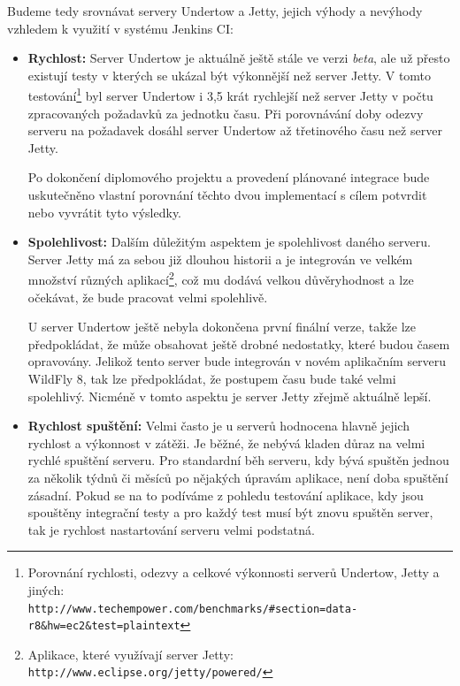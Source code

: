             \medskip
            Budeme tedy srovnávat servery Undertow a Jetty, jejich výhody a nevýhody
            vzhledem k využití v systému Jenkins CI:
            \begin{itemize}
                \item {\textbf{Rychlost:} Server Undertow je aktuálně ještě stále ve verzi \emph{beta}, ale už přesto existují
                    testy v kterých se ukázal být výkonnější než server Jetty. V tomto           
                    testování\footnote{Porovnání rychlosti, odezvy a celkové výkonnosti serverů Undertow, Jetty a jiných: 
                    \\\texttt{http://www.techempower.com/benchmarks/\#section=data-r8\&hw=ec2\&test=plaintext}}
                    byl server Undertow i 3,5 krát rychlejší než server Jetty v počtu zpracovaných
                    požadavků za jednotku času. Při porovnávání doby odezvy serveru na požadavek
                    dosáhl server Undertow až třetinového času než server Jetty.
        
                    Po dokončení diplomového projektu a provedení plánované
                    integrace bude uskutečněno vlastní porovnání těchto dvou implementací s cílem potvrdit
                    nebo vyvrátit tyto výsledky.}

                \item{\textbf{Spolehlivost:} Dalším důležitým aspektem je spolehlivost daného serveru. 
                        Server Jetty má za sebou již dlouhou historii a je integrován ve velkém množství
                        různých aplikací\footnote{Aplikace, které využívají server Jetty: \texttt{http://www.eclipse.org/jetty/powered/}},
                        což mu dodává velkou důvěryhodnost a lze očekávat, že bude pracovat velmi 
                        spolehlivě. 
                        
                        U server Undertow ještě nebyla dokončena první finální verze,
                        takže lze předpokládat, že může obsahovat ještě drobné nedostatky,
                        které budou časem opravovány. Jelikož tento server bude integrován
                        v novém aplikačním serveru WildFly 8, tak lze předpokládat,
                        že postupem času bude také velmi spolehlivý. 
                        Nicméně v tomto aspektu je server Jetty zřejmě 
                        aktuálně lepší.}

                \item{\textbf{Rychlost spuštění:}  Velmi často je u serverů hodnocena hlavně
                    jejich rychlost a výkonnost v zátěži. Je běžné, že nebývá kladen důraz na
                    velmi rychlé spuštění serveru. Pro standardní běh serveru, kdy bývá 
                    spuštěn jednou za několik týdnů či měsíců po nějakých úpravám aplikace,
                    není doba spuštění zásadní. Pokud se na to podíváme z pohledu testování
                    aplikace, kdy jsou spouštěny integrační testy a pro každý test musí být
                    znovu spuštěn server, tak je rychlost nastartování serveru velmi podstatná.
                    
}
\end{itemize}
